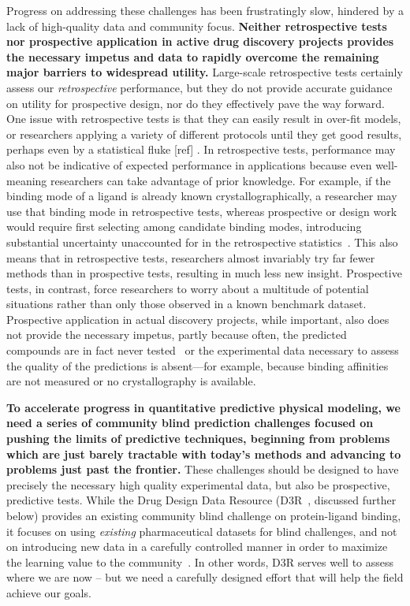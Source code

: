 \documentclass[11pt]{article}
\begin{document}
Progress on addressing these challenges has been frustratingly slow, hindered by a lack of high-quality data and community focus.
{\bf Neither retrospective tests nor prospective application in active drug discovery projects provides the necessary impetus and data to rapidly overcome the remaining major barriers to widespread utility.}
Large-scale retrospective tests certainly assess our \emph{retrospective} performance, but they do not provide accurate guidance on utility for prospective design, nor do they effectively pave the way forward.
One issue with retrospective tests is that they can easily result in over-fit models, or researchers applying a variety of different protocols until they get good results, perhaps even by a statistical fluke [ref] .
In retrospective tests, performance may also not be indicative of expected performance in applications because even well-meaning researchers can take advantage of prior knowledge. 
For example, if the binding mode of a ligand is already known crystallographically, a researcher may use that binding mode in retrospective tests, whereas prospective or design work would require first selecting among candidate binding modes, introducing substantial uncertainty unaccounted for in the retrospective statistics~\cite{mobley_predicting_2007, boyce_predicting_2009, mobley_perspective_2012}.
This also means that in retrospective tests, researchers almost invariably try far fewer methods than in prospective tests, resulting in much less new insight.
Prospective tests, in contrast, force researchers to worry about a multitude of potential situations rather than only those observed in a known benchmark dataset.
Prospective application in actual discovery projects, while important, also does not provide the necessary impetus, partly because often, the predicted compounds are in fact never tested~\cite{christ_binding_2016} or the experimental data necessary to assess the quality of the predictions is absent---for example, because binding affinities are not measured or no crystallography is available. 

{\bf To accelerate progress in quantitative predictive physical modeling, we need a series of community blind prediction challenges focused on pushing the limits of predictive techniques, beginning from problems which are just barely tractable with today's methods and advancing to problems just past the frontier.}
These challenges should be designed to have precisely the necessary high quality experimental data, but also be prospective, predictive tests.
While the Drug Design Data Resource (D3R~\cite{gathiaka_d3r_2016}, discussed further below) provides an existing community blind challenge on protein-ligand binding, it focuses on using \emph{existing} pharmaceutical datasets for blind challenges, and not on introducing new data in a carefully controlled manner in order to maximize the learning value to the community~\cite{gathiaka_d3r_2016}. 
In other words, D3R serves well to assess where we are now -- but we need a carefully designed effort that will help the field achieve our goals.
\end{document}
